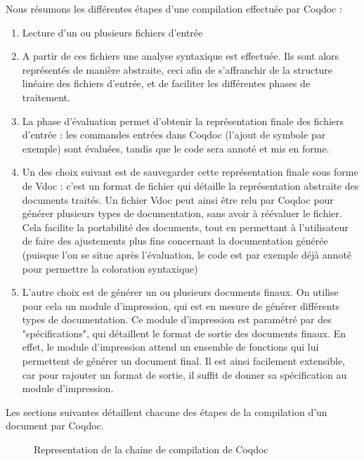 \documentclass[a4paper, 11pt]{report}
\begin{document}
    Nous résumons les différentes étapes d'une compilation effectuée par
    Coqdoc :
    \begin{enumerate}
      \item Lecture d'un ou plusieurs fichiers d'entrée
      \item A partir de ces fichiers une analyse syntaxique est effectuée.
        Ils sont alors représentés de manière abstraite, ceci afin de
        s'affranchir de la structure linéaire des fichiers d'entrée, et de
        faciliter les différentes phases de traitement.
      \item La phase d'évaluation permet d'obtenir la représentation finale
        des fichiers d'entrée : les commandes entrées dans Coqdoc (l'ajout
        de symbole par exemple) sont évaluées, tandis que le code sera annoté
        et mis en forme.
      \item Un des choix suivant est de sauvegarder cette représentation
        finale sous forme de Vdoc : c'est un format de fichier qui détaille
        la représentation abstraite des documents traités.
        Un fichier Vdoc peut ainsi être relu par Coqdoc pour générer plusieurs
        types de documentation, sans avoir à réévaluer le fichier. Cela facilite
        la portabilité des documents, tout en permettant à l'utilisateur de faire
        des ajustements plus fins concernant la documentation générée (puisque
        l'on se situe après l'évaluation, le code est par exemple déjà annoté
        pour permettre la coloration syntaxique)
      \item L'autre choix est de générer un ou plusieurs documents finaux.
        On utilise pour cela un module d'impression, qui est en mesure de
        générer différents types de documentation.
        Ce module d'impression est paramétré par des "spécifications", qui
        détaillent le format de sortie des documents finaux. En effet, le
        module d'impression attend un ensemble de fonctions qui lui
        permettent de générer un document final.
        Il est ainsi facilement extensible, car pour rajouter un format de
        sortie, il suffit de donner sa spécification au module d'impression.
    \end{enumerate}

    Les sections suivantes détaillent chacune des étapes de la compilation
    d'un document par Coqdoc.
    \begin{figure}
      \caption{Representation de la chaine de compilation de Coqdoc}
      \label{fig:devchain}
    \end{figure}
    \clearpage
\end{document}
